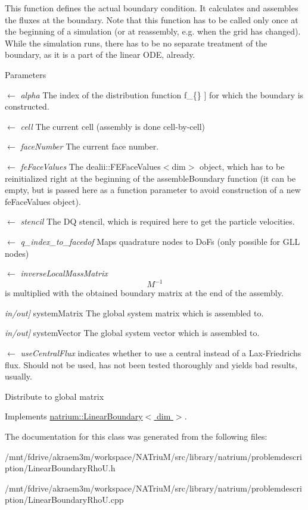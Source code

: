 This function defines the actual boundary condition. It calculates and assembles the fluxes at the boundary. Note that this function has to be called only once at the beginning of a simulation (or at reassembly, e.g. when the grid has changed). While the simulation runs, there has to be no separate treatment of the boundary, as it is a part of the linear ODE, already. 
\begin{DoxyParams}{Parameters}
\item[\mbox{$\leftarrow$} {\em alpha}]The index of the distribution function  f\_\-\{\} \mbox{]} for which the boundary is constructed. \item[\mbox{$\leftarrow$} {\em cell}]The current cell (assembly is done cell-\/by-\/cell) \item[\mbox{$\leftarrow$} {\em faceNumber}]The current face number. \item[\mbox{$\leftarrow$} {\em feFaceValues}]The dealii::FEFaceValues$<$dim$>$ object, which has to be reinitialized right at the beginning of the assembleBoundary function (it can be empty, but is passed here as a function parameter to avoid construction of a new feFaceValues object). \item[\mbox{$\leftarrow$} {\em stencil}]The DQ stencil, which is required here to get the particle velocities. \item[\mbox{$\leftarrow$} {\em q\_\-index\_\-to\_\-facedof}]Maps quadrature nodes to DoFs (only possible for GLL nodes) \item[\mbox{$\leftarrow$} {\em inverseLocalMassMatrix}]\[ M^{-1} \] is multiplied with the obtained boundary matrix at the end of the assembly. \item[{\em in/out\mbox{]}}]systemMatrix The global system matrix which is assembled to. \item[{\em in/out\mbox{]}}]systemVector The global system vector which is assembled to. \item[\mbox{$\leftarrow$} {\em useCentralFlux}]indicates whether to use a central instead of a Lax-\/Friedrichs flux. Should not be used, has not been tested thoroughly and yields bad results, usually. \end{DoxyParams}


Distribute to global matrix 

Implements \hyperlink{classnatrium_1_1LinearBoundary_a4f6ff88796031a747cab3db1be4ac603}{natrium::LinearBoundary$<$ dim $>$}.

The documentation for this class was generated from the following files:\begin{DoxyCompactItemize}
\item 
/mnt/fdrive/akraem3m/workspace/NATriuM/src/library/natrium/problemdescription/LinearBoundaryRhoU.h\item 
/mnt/fdrive/akraem3m/workspace/NATriuM/src/library/natrium/problemdescription/LinearBoundaryRhoU.cpp\end{DoxyCompactItemize}
